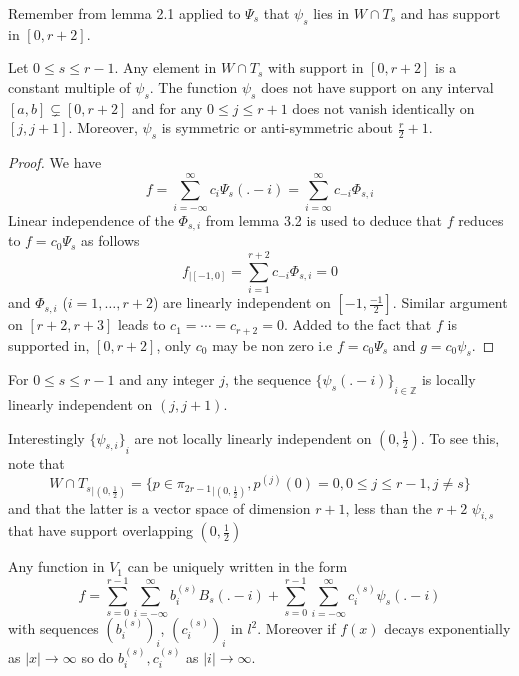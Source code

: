 \documentclass[a4paper, 11pt]{article}
\begin{document}
Remember from lemma 2.1 applied to $\Psi_s$ that $\psi_s$ lies in $W \cap T_s$ and has support in $[0, r+2]$. 

\begin{thm}{3.2}
  Let $0 \leq s \leq r-1$. Any element in $W \cap T_s$ with support in $[0, r+2]$ is a constant multiple of $\psi_s$.  
  The function $\psi_s$ does not have support on any interval $[a,b] \subsetneq [0, r+2]$ and for any $0 \leq j \leq 
  r+1$ does not vanish identically on $[j,j+1]$. Moreover, $\psi_s$ is symmetric or anti-symmetric about 
  $\frac{r}{2}+1$.
\end{thm}

\begin{proof}
  We have
  \begin{equation*}
    f = \sum_{i=-\infty}^{\infty} c_i \Psi_s(.-i) = \sum_{i=\infty}^{\infty} c_{-i} \Phi_{s,i}
  \end{equation*}
  Linear independence of the $\Phi_{s,i}$ from lemma 3.2 is used to deduce that $f$ reduces to $f = c_0 \Psi_s$ as 
  follows
  \begin{equation*}
    f_{|[-1,0]} = \sum_{i=1}^{r+2} c_{-i} \Phi_{s,i} = 0
  \end{equation*}
  and $\Phi_{s,i}$ ($i=1, \ldots, r+2$) are linearly independent on $[-1, \frac{-1}{2}]$. Similar argument on $[r+2, 
  r+3]$ leads to $c_1 = \cdots = c_{r+2} = 0$. Added to the fact that $f$ is supported in, $[0, r+2]$, only $c_0$ may be 
  non zero i.e $f = c_0 \Psi_s$ and $g = c_0 \psi_s$.
\end{proof}

\begin{thm}{3.3}
  For $0 \leq s \leq r-1$ and any integer $j$, the sequence ${\{\psi_s(.-i)\}}_{i \in \mathbb{Z}}$ is locally linearly 
  independent on $(j,j+1)$.
\end{thm}

\begin{remark}{1}
  Interestingly ${\{\psi_{s,i}\}}_i$ are not locally linearly independent on $(0,\frac{1}{2})$. To see this, note that 
  \begin{equation}
    {W \cap T_s}_{|(0, \frac{1}{2})} = \{p \in {\pi_{2r-1}}_{|(0,\frac{1}{2})}, p^{(j)}(0) = 0, 0 \leq j\leq r-1,j\neq 
    s\}
  \end{equation}
  and that the latter is a vector space of dimension $r+1$, less than  the $r+2$ $\psi_{i,s}$ that have support 
  overlapping $(0, \frac{1}{2})$
\end{remark}


\begin{thm}{3.4}
  Any function in $V_1$ can be uniquely written in the form
  \begin{equation}
    f = \sum_{s=0}^{r-1} \sum_{i=-\infty}^{\infty} b^{(s)}_i B_s(.-i) +\sum_{s=0}^{r-1} \sum_{i=-\infty}^{\infty} 
    c^{(s)}_i \psi_s(.-i)
  \end{equation}
  with sequences ${(b^{(s)}_i)}_i$, ${(c^{(s)}_i)}_i$ in $l^2$. Moreover if $f(x)$ decays exponentially as $|x| \to 
  \infty$ so do $b^{(s)}_i, c^{(s)}_i$ as $|i| \to \infty$.
\end{thm}
\end{document}
